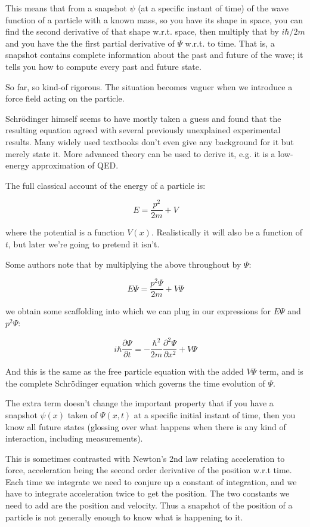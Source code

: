 This means that from a snapshot $\psi$ (at a specific instant of time) of the wave function of a particle with a known mass, so you have its shape in space, you can find the second derivative of that shape w.r.t. space, then multiply that by $i\hbar/2m$ and you have the the first partial derivative of $\Psi$ w.r.t. to time. That is, a snapshot contains complete information about the past and future of the wave; it tells you how to compute every past and future state.

So far, so kind-of rigorous. The situation becomes vaguer when we introduce a force field acting on the particle.

Schrödinger himself seems to have mostly taken a guess and found that the resulting equation agreed with several previously unexplained experimental results. Many widely used textbooks don't even give any background for it but merely state it. More advanced theory can be used to derive it, e.g. it is a low-energy approximation of QED.

The full classical account of the energy of a particle is:

$$
E = \frac{p^2}{2m} + V
$$

where the potential is a function $V(x)$. Realistically it will also be a function of $t$, but later we're going to pretend it isn't.

Some authors note that by multiplying the above throughout by $\Psi$:

$$
E\Psi = \frac{p^2{\Psi}}{2m} + V{\Psi}
$$

we obtain some scaffolding into which we can plug in our expressions for $E \Psi$ and $p^2 \Psi$:

\begin{equation}
i\hbar \frac{\partial \Psi}{\partial t}
=
- \frac{\hbar^2}{2m} \frac{\partial^2 \Psi}{\partial x^2}
+ V{\Psi}
\label{eqn:se}
\end{equation}

And this is the same as the free particle equation with the added $V\Psi$ term, and is the complete Schrödinger equation which governs the time evolution of $\Psi$.

The extra term doesn't change the important property that if you have a snapshot $\psi(x)$ taken of $\Psi(x, t)$ at a specific initial instant of time, then you know all future states (glossing over what happens when there is any kind of interaction, including measurements).

This is sometimes contrasted with Newton's 2nd law relating acceleration to force, acceleration being the second order derivative of the position w.r.t time. Each time we integrate we need to conjure up a constant of integration, and we have to integrate acceleration twice to get the position. The two constants we need to add are the position and velocity. Thus a snapshot of the position of a particle is not generally enough to know what is happening to it.

